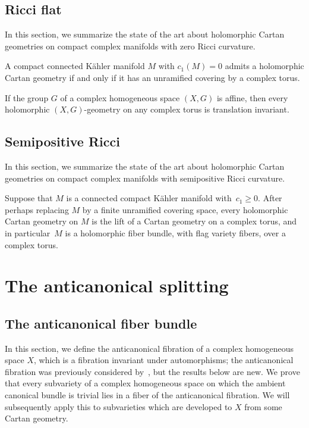 \subsection{Ricci flat}
In this section, we summarize the state of the art about holomorphic Cartan geometries on compact complex manifolds with zero Ricci curvature.
\begin{Theorem}\label{thm:cpt.Kaehler.c.1.0}
A compact connected K\"ahler manifold $M$ with $c_1(M)=0$ admits a holomorphic Cartan geometry if and only if it has an unramified covering by a complex torus.
\end{Theorem}

\begin{Theorem}\label{theorem:BD.torus}
If the group $G$ of a complex homogeneous space $(X, G)$ is affine, then every holomorphic $(X, G)$-geometry on any complex
torus is translation invariant.
\end{Theorem}

\subsection{Semipositive Ricci}
In this section, we summarize the state of the art about holomorphic Cartan geometries on compact complex manifolds with semipositive Ricci curvature.
\begin{Theorem}\label{theorem:semipos}
Suppose that $M$ is a connected compact K\"ahler manifold with~${c_1 \ge 0}$.
After perhaps replacing $M$ by a finite unramified covering space, every holomorphic Cartan geometry on $M$ is the lift of a Cartan geometry on a complex torus, and in particular~$M$ is a holomorphic fiber bundle, with flag variety fibers, over a complex torus.
\end{Theorem}


\section{The anticanonical splitting}\label{section:the.anticanonical.splitting}
\subsection{The anticanonical fiber bundle}
In this section, we define the anticanonical fibration of a complex homogeneous space $X$, which is a fibration invariant under automorphisms; the anticanonical fibration was previously considered by~\cite{Huckleberry:1986}, but the results below are new.
We prove that every subvariety of a complex homogeneous space on which the ambient canonical bundle is trivial lies in a fiber of the anticanonical fibration.
We will subsequently apply this to subvarieties which are developed to $X$ from some Cartan geometry.


